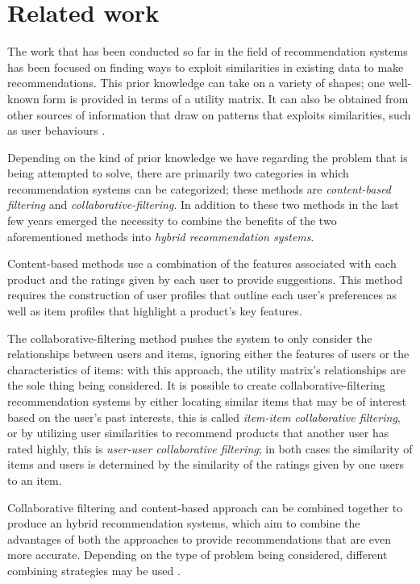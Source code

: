 \section{Related work}

The work that has been conducted so far in the field of recommendation systems has been focused on finding ways to exploit similarities in existing data to make recommendations. This prior knowledge can take on a variety of shapes; one well-known form is provided in terms of a utility matrix. It can also be obtained from other sources of information that draw on patterns that exploits similarities, such as user behaviours \cite{user_behaviour_rec}. 


Depending on the kind of prior knowledge we have regarding the problem that is being attempted to solve, there are primarily two categories in which recommendation systems can be categorized; these methods are \emph{content-based filtering} and \emph{collaborative-filtering}. In addition to these two methods in the last few years emerged the necessity to combine the benefits of the two aforementioned methods into \emph{hybrid recommendation systems}.

Content-based methods use a combination of the features associated with each product and the ratings given by each user to provide suggestions. This method requires the construction of user profiles that outline each user's preferences as well as item profiles that highlight a product's key features. 

The collaborative-filtering method pushes the system to only consider the relationships between users and items, ignoring either the features of users or the characteristics of items: with this approach, the utility matrix's relationships are the sole thing being considered. It is possible to create collaborative-filtering recommendation systems by either locating similar items that may be of interest based on the user's past interests, this is called \emph{item-item collaborative filtering}, or by utilizing user similarities to recommend products that another user has rated highly, this is \emph{user-user collaborative filtering}; in both cases the similarity of items and users is determined by the similarity of the ratings given by one users to an item. 

Collaborative filtering and content-based approach can be combined together to produce an hybrid recommendation systems, which aim to combine the advantages of both the approaches to provide recommendations that are even more accurate. Depending on the type of problem being considered, different combining strategies may be used \cite{user_behaviour_rec}.  

